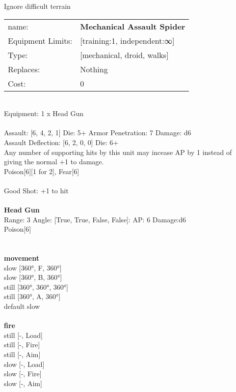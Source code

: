 \noindent Ignore difficult terrain\\ 


\noindent
\begin{tabular}{ll}
name: &{\bf Mechanical Assault Spider } \\
Equipment Limits: &[training:1, independent:∞] \\
Type: &[mechanical, droid, walks] \\
Replaces: &Nothing \\
Cost: & 0\\
\end{tabular}
\ \\
Equipment: 1 x Head Gun \\
\ \\
Assault: [6, 4, 2, 1] Die: 5+ Armor Penetration: 7 Damage: d6 \\
Assault Deflection: [6, 2, 0, 0] Die: 6+\\
\indent Any number of supporting hits by this unit may incease AP by 1 instead of giving the normal +1 to damage.\\ 
Poison[6][1 for 2], Fear[6]\\ 
 
\ \\
Good Shot: +1 to hit\\ 

\ \\
{\bf Head Gun } \\



Range: 3  Angle: [True, True, False, False]: AP: 6 Damage:d6 \\
Poison[6]\\ 




 
\ \\



\ \\ {\bf movement } \\
slow [360°, F, 360°] \\
slow [360°, B, 360°] \\
still [360°, 360°, 360°] \\
still [360°, A, 360°] \\
default slow \\
\ \\ {\bf fire } \\
still [-, Load] \\
still [-, Fire] \\
still [-, Aim] \\
slow [-, Load] \\
slow [-, Fire] \\
slow [-, Aim] \\


